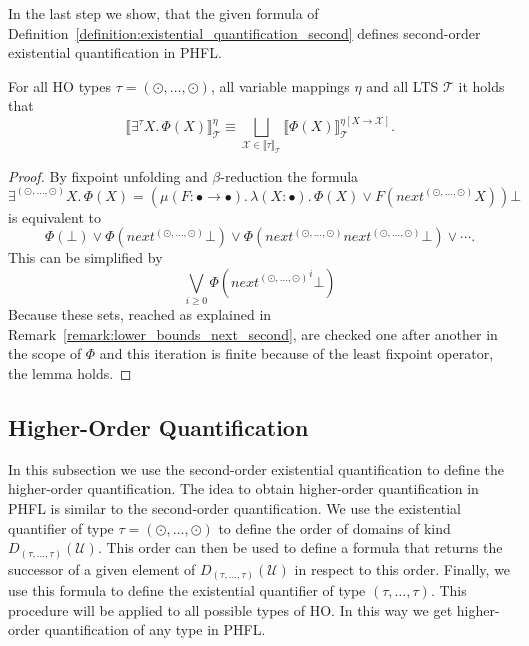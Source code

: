 In the last step we show, that the given formula of Definition~\ref{definition:existential_quantification_second} defines
second-order existential quantification in PHFL.

\begin{lemma}
    \label{lemma:existential_quantifier_second}
    For all HO types $\tau = (\odot, \dots, \odot)$, all variable mappings $\eta$ and all LTS $\mathcal{T}$ it holds that
    \[\llbracket \exists^\tau X.\,\Phi(X)\rrbracket^\eta_\mathcal{T} \equiv \underset{\mathcal{X} \in \llbracket \tau
    \rrbracket_\mathcal{T}}{\bigsqcup} \llbracket \Phi(X) \rrbracket^{\eta[X\rightarrow \mathcal{X}]}_\mathcal{T}.\]
\end{lemma}

\begin{proof}
    By fixpoint unfolding and $\beta$-reduction the formula 
    \[\exists^{(\odot, \dots, \odot)}X.\, \Phi(X) = (\mu (F \colon \bullet \rightarrow \bullet).\, \lambda (X
    \colon \bullet).\, \Phi(X) \vee F(next^{(\odot, \dots, \odot)} X)) \bot\] is equivalent to 
    \[\Phi(\bot) \vee \Phi(next^{(\odot, \dots, \odot)}\bot) \vee \Phi(next^{(\odot, \dots, \odot)} next^{(\odot, \dots, \odot)} \bot) \vee \dotsb. \]
    This can be simplified by
    \[\underset{i\geq0}{\bigvee} \Phi({next^{(\odot, \dots, \odot)}}^i \bot)\]
	Because these sets, reached as explained in Remark~\ref{remark:lower_bounds_next_second}, are checked one after another in the scope of $\Phi$ and this iteration is finite 
	because of the least fixpoint operator, the lemma holds.
\end{proof}

\subsection{Higher-Order Quantification}\label{subsec:higher-orderQuantification}

In this subsection we use the second-order existential quantification to define the higher-order
quantification. The idea to obtain higher-order quantification in PHFL is similar to the second-order quantification.
We use the existential quantifier of type $\tau = (\odot, \dots, \odot)$ to define the order of domains of kind
$D_{(\tau, \dots, \tau)}(\mathcal{U})$. This order can then be used to define a formula that returns the successor
of a given element of $D_{(\tau, \dots, \tau)}(\mathcal{U})$ in respect to this order. Finally, we use this
formula to define the existential quantifier of type $(\tau, \dots, \tau)$. This procedure will be applied to all
possible types of HO. In this way we get higher-order quantification of any type in PHFL.

